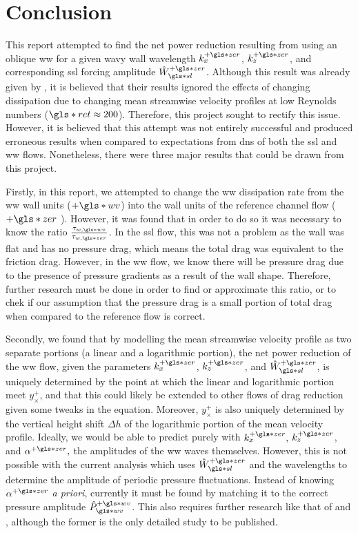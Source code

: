 \chapter{Conclusion}\glsresetall
This report attempted to find the net power reduction resulting from using an oblique \gls*{ww} for a given wavy wall wavelength $k_x\pz$,  $k_z\pz$, and corresponding  \gls*{ssl} forcing amplitude $\hat{W}\pz\ssl$. Although this result was already given by \sct, it is believed that their results ignored the effects of changing dissipation due to changing mean streamwise velocity profiles at low Reynolds numbers ($\gls*{ret}\approx200$). Therefore, this project sought to rectify this issue. However, it is believed that this attempt was not entirely successful and produced erroneous results when compared to expectations from \gls*{dns} of both the \gls*{ssl} and \gls*{ww} flows. Nonetheless, there were three major results that could be drawn from this project.

Firstly, in this report, we attempted to change the \gls*{ww} dissipation rate from the \gls*{ww} wall units ($+\gls*{wv}$) into the wall units of the reference channel flow ($+\gls*{zer}$ ). However, it was found that in order to do so it was necessary to know the ratio $\frac{\tau_{w,\gls*{wv}}}{\tau_{w,\gls*{zer}}}$. In the \gls*{ssl} flow, this was not a problem as the wall was flat and has no pressure drag, which means the total drag was equivalent to the friction drag. However, in the \gls*{ww} flow, we know there will be pressure drag due to the presence of pressure gradients as a result of the wall shape. Therefore, further research must be done in order to find or approximate this ratio, or to chek if our assumption that the pressure drag is a small portion of total drag when compared to the reference flow is correct.

Secondly, we found that by modelling the mean streamwise velocity profile as two separate portions (a linear and a logarithmic portion), the net power reduction of the \gls*{ww} flow, given the parameters $k_x\pz$,  $k_z\pz$, and  $\hat{W}\pz\ssl$, is uniquely determined by the point at which the linear and logarithmic portion meet $y_{\times}^{+}$, and that this could likely be extended to other flows of drag reduction given some tweaks in the equation. Moreover, $y_{\times}^{+}$ is also uniquely determined by the vertical height shift $\Delta h$ of the logarithmic portion of the mean velocity profile. Ideally, we would be able to predict purely with $k_x\pz,$  $k_z\pz$, and  $\alpha\pz,$ the amplitudes of the  \gls*{ww} waves themselves. However, this is not possible with the current analysis which uses $\hat{W}\pz\ssl$ and the wavelengths to determine the amplitude of periodic pressure fluctuations. Instead of knowing $\alpha\pz$ \textit{a priori}, currently it must be found by matching it to the correct pressure amplitude  $\hat{P}\pw\ww$. This also requires further research like that of \textcite{ghebali2017} and \textcite{denison2015}, although the former is the only detailed study to be published.

